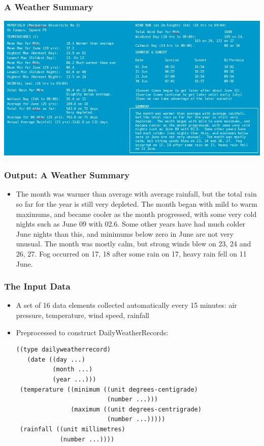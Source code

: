 \documentclass[compress,color=usenames]{beamer}
\begin{document}
\begin{frame}
\frametitle{A Weather Summary}

\begin{center}
\includegraphics[scale=.47]{pics/pic5.jpg}
\end{center}

\end{frame}


\begin{frame}
\frametitle{Output: A Weather Summary}

\label{f70}
\begin{itemize}
\item { {The month was warmer than average with average rainfall, but the total rain so far for the year is still very depleted. The month began with mild to warm maximums, and became cooler as the month progressed, with some very cold nights such as June 09 with 02.6. Some other years have had much colder June nights than this, and minimums below zero in June are not very unusual. The month was mostly calm, but strong winds blew on 23, 24 and 26, 27. Fog occurred on 17, 18 after some rain on 17, heavy rain fell on 11 June.}}
\end{itemize}

\end{frame}

\begin{frame}[fragile]
\frametitle{The Input Data}

\begin{itemize}
\item { {A set of 16 data elements collected automatically every 15 minutes: air pressure, temperature, wind speed, rainfall }}
\item { {Preprocessed to construct DailyWeatherRecords:}}

\begin{verbatim}
((type dailyweatherrecord)
   (date ((day ...)
          (month ...)
          (year ...)))
 (temperature ((minimum ((unit degrees-centigrade)
                         (number ...)))
               (maximum ((unit degrees-centrigrade)
                         (number ...)))))
 (rainfall ((unit millimetres)
            (number ...))))
\end{verbatim}

\end{itemize}
\end{frame}
\end{document}
